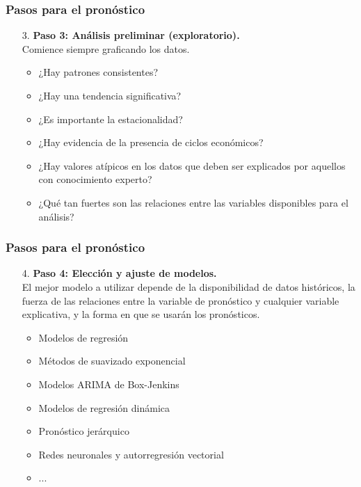 \documentclass[10pt]{beamer}
\begin{document}
\begin{frame}
\frametitle{Pasos para el pronóstico}


\begin{enumerate}
\item[3.] \textbf{Paso 3: Análisis preliminar (exploratorio).}  \\
Comience siempre graficando los datos. 
\begin{itemize}
\item ¿Hay patrones consistentes? 
\item ¿Hay una tendencia significativa? 
\item ¿Es importante la estacionalidad? 
\item ¿Hay evidencia de la presencia de ciclos económicos? 
\item ¿Hay valores atípicos en los datos que deben ser explicados por aquellos con conocimiento experto? 
\item ¿Qué tan fuertes son las relaciones entre las variables disponibles para el análisis?
\end{itemize}

\end{enumerate}

\end{frame}







\begin{frame}
\frametitle{Pasos para el pronóstico}


\begin{enumerate}
\item[4.] \textbf{Paso 4: Elección y ajuste de modelos.}  \\
El mejor modelo a utilizar depende de la disponibilidad de datos históricos, la fuerza de las relaciones entre la variable de pronóstico y cualquier variable explicativa, y la forma en que se usarán los pronósticos.
\begin{itemize}
\item Modelos de regresión
\item Métodos de suavizado exponencial
\item Modelos ARIMA de Box-Jenkins
\item Modelos de regresión dinámica
\item Pronóstico jerárquico
\item Redes neuronales y autorregresión vectorial
\item ...
\end{itemize}

\end{enumerate}

\end{frame}
\end{document}
